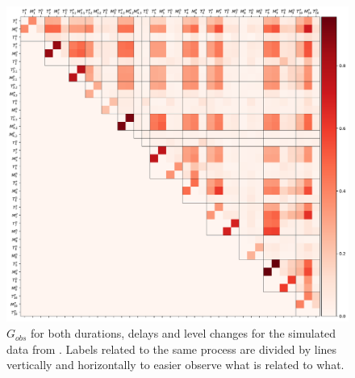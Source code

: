\documentclass[../Thesis.tex]{subfiles}
\begin{document}
\begin{figure}[ht]
    \centering
    \includegraphics[width = \linewidth]{figures/Cycle data/G_obs times and levelchanges - semi-directed.pdf}
    \caption{$G_{obs}$ for both durations, delays and level changes for the simulated data from \cite{benchmark-model-to-generate-batch-process-data}. Labels related to the same process are divided by lines vertically and horizontally to easier observe what is related to what.}
    \label{fig:G_obs times and levelchanges - semi-directed}
\end{figure}
\end{document}
